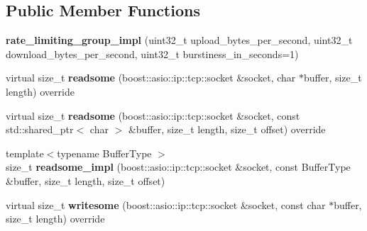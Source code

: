 \subsection*{Public Member Functions}
\begin{DoxyCompactItemize}
\item 
\mbox{\label{classfc_1_1detail_1_1rate__limiting__group__impl_a863869f673130316f4f8af14f83bbbf5}} 
{\bfseries rate\+\_\+limiting\+\_\+group\+\_\+impl} (uint32\+\_\+t upload\+\_\+bytes\+\_\+per\+\_\+second, uint32\+\_\+t download\+\_\+bytes\+\_\+per\+\_\+second, uint32\+\_\+t burstiness\+\_\+in\+\_\+seconds=1)
\item 
\mbox{\label{classfc_1_1detail_1_1rate__limiting__group__impl_a8fe749da93ec7a60083d03c8a82a5091}} 
virtual size\+\_\+t {\bfseries readsome} (boost\+::asio\+::ip\+::tcp\+::socket \&socket, char $\ast$buffer, size\+\_\+t length) override
\item 
\mbox{\label{classfc_1_1detail_1_1rate__limiting__group__impl_a77951eaab9932d076e231fabdbfde61e}} 
virtual size\+\_\+t {\bfseries readsome} (boost\+::asio\+::ip\+::tcp\+::socket \&socket, const std\+::shared\+\_\+ptr$<$ char $>$ \&buffer, size\+\_\+t length, size\+\_\+t offset) override
\item 
\mbox{\label{classfc_1_1detail_1_1rate__limiting__group__impl_ac9c0f88e27254463a65975d5cc8484cd}} 
{\footnotesize template$<$typename Buffer\+Type $>$ }\\size\+\_\+t {\bfseries readsome\+\_\+impl} (boost\+::asio\+::ip\+::tcp\+::socket \&socket, const Buffer\+Type \&buffer, size\+\_\+t length, size\+\_\+t offset)
\item 
\mbox{\label{classfc_1_1detail_1_1rate__limiting__group__impl_a50b7ec22b99f4ff67d71e44f2e2bdc88}} 
virtual size\+\_\+t {\bfseries writesome} (boost\+::asio\+::ip\+::tcp\+::socket \&socket, const char $\ast$buffer, size\+\_\+t length) override
\item 
\mbox{\label{classfc_1_1detail_1_1rate__limiting__group__impl_ab6a53d6b835cb2d3ada56c834dc0bbe5}} 

\end{DoxyCompactItemize}
